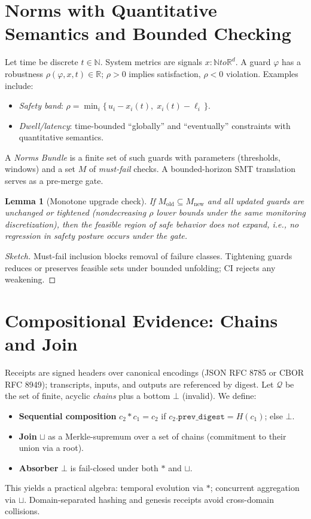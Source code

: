 \documentclass[11pt,a4paper]{article}
\numberwithin{equation}{section}
\theoremstyle{plain}
\newtheorem{lemma}[theorem]{Lemma}
\theoremstyle{definition}
\theoremstyle{remark}
\newcommand{\bbR}{\mathbb{R}}
\newcommand{\calQ}{\mathcal{Q}}    %
\newcommand{\join}{\sqcup}         %
\def\to{to}%
\begin{document}
\section{Norms with Quantitative Semantics and Bounded Checking}
Let time be discrete $t\in\mathbb{N}$. System metrics are signals $x:\mathbb{N}\to\bbR^d$. A guard $\varphi$ has a robustness $\rho(\varphi,x,t)\in\bbR$; $\rho>0$ implies satisfaction, $\rho<0$ violation. Examples include:
\begin{itemize}
  \item \emph{Safety band}:\; $\rho = \min_i \{\,u_i - x_i(t),\; x_i(t) - \ell_i\,\}$.
  \item \emph{Dwell/latency}:\; time-bounded ``globally'' and ``eventually'' constraints with quantitative semantics.
\end{itemize}
A \emph{Norms Bundle} is a finite set of such guards with parameters (thresholds, windows) and a set $M$ of \emph{must-fail} checks. A bounded-horizon SMT translation serves as a pre-merge gate.

\begin{lemma}[Monotone upgrade check]
If $M_{\mathrm{old}}\subseteq M_{\mathrm{new}}$ and all updated guards are unchanged or tightened (nondecreasing $\rho$ lower bounds under the same monitoring discretization), then the feasible region of safe behavior does not expand, i.e., no regression in safety posture occurs under the gate.
\end{lemma}

\begin{proof}[Sketch]
Must-fail inclusion blocks removal of failure classes. Tightening guards reduces or preserves feasible sets under bounded unfolding; CI rejects any weakening. \end{proof}

\section{Compositional Evidence: Chains and Join}
Receipts are signed headers over canonical encodings (JSON RFC 8785 or CBOR RFC 8949); transcripts, inputs, and outputs are referenced by digest. Let $\calQ$ be the set of finite, acyclic \emph{chains} plus a bottom $\bot$ (invalid). We define:
\begin{itemize}
  \item \textbf{Sequential composition} $c_2 * c_1 = c_2$ if $c_2.\texttt{prev\_digest} = H(c_1)$; else $\bot$.
  \item \textbf{Join} $\join$ as a Merkle-supremum over a set of chains (commitment to their union via a root).
  \item \textbf{Absorber} $\bot$ is fail-closed under both $*$ and $\join$.
\end{itemize}
This yields a practical algebra: temporal evolution via $*$; concurrent aggregation via $\join$. Domain-separated hashing and genesis receipts avoid cross-domain collisions.
\end{document}
